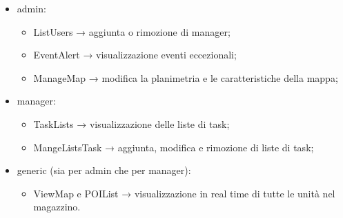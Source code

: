 \begin{itemize}
	\item admin:
	\begin{itemize}
		\item ListUsers → aggiunta o rimozione di manager;
		\item EventAlert → visualizzazione eventi eccezionali;
		\item ManageMap → modifica la planimetria e le caratteristiche della mappa;
	\end{itemize}
	\item manager:
	\begin{itemize}
		\item TaskLists → visualizzazione delle liste di task;
		\item MangeListsTask → aggiunta, modifica e rimozione di liste di task;
	\end{itemize}
	\item generic (sia per admin che per manager):
	\begin{itemize}
		\item ViewMap e POIList → visualizzazione in real time di tutte le unità nel magazzino.
	\end{itemize}
\end{itemize}



